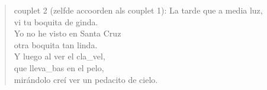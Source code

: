 \begin{verse}{couplet 2 (zelfde accoorden als couplet 1):}
La tarde que a media luz,\\
vi tu boquita de ginda.\\
Yo no he visto en Santa Cruz\\
otra boquita tan linda. \hspace{1em} \hspace{1em} \hspace{1em}\\
Y luego al ver el cla\_vel,\\
\hspace{1em} que lleva\_bas  \hspace{1em} en el pelo, \hspace{1em} \hspace{1em} \hspace{1em}\\
mirándolo creí  ver
un pedacito de cielo.
\end{verse}